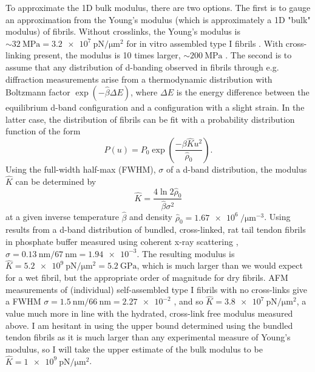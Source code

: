 \documentclass[12pt]{article}
\begin{document}
To approximate the 1D bulk modulus, there are two options. The first is to gauge an approximation from the Young's modulus (which is approximately a 1D "bulk" modulus) of fibrils. Without crosslinks, the Young's modulus is $\sim\SI{32}{\mega\pascal}=\SI{3.2e7}{\pico\newton\per\micro\meter^2}$ for in vitro assembled type I fibrils \cite{Graham:2004bl}. With cross-linking present, the modulus is 10 times larger, $\sim\SI{200}{\mega\pascal}$ \cite{vanderRijt:2006bt}. The second is to assume that any distribution of d-banding observed in fibrils through e.g. diffraction measurements arise from a thermodynamic distribution with Boltzmann factor $\exp(-\hat{\beta}\Delta E)$, where $\Delta E$ is the energy difference between the equilibrium d-band configuration and a configuration with a slight strain. In the latter case, the distribution of fibrils can be fit with a probability distribution function of the form
\begin{equation}\label{eq:dbandpdf}
P(u)=P_0\exp\left(\frac{-\beta\hat{K}u^2}{\hat{\rho}_0}\right).
\end{equation}
Using the full-width half-max (FWHM), $\sigma$ of a d-band distribution, the modulus $\hat{K}$ can be determined by
\begin{equation}\label{eq:FWHM}
\hat{K}=\frac{4\ln2\hat{\rho}_0}{\hat{\beta}\sigma^2}
\end{equation}
at a given inverse temperature $\hat{\beta}$ and density $\hat{\rho}_0=\SI{1.67e6}{\per\micro\meter^{-3}}$. Using results from a d-band distribution of bundled, cross-linked, rat tail tendon fibrils in phosphate buffer measured using coherent x-ray scattering \cite{Berenguer:2014fe}, $\sigma=\SI{0.13}{\nano\meter}/\SI{67}{\nano\meter}=\num{1.94e-3}$. The resulting modulus is $\hat{K}=\SI{5.2e9}{\pico\newton\per\micro\meter\squared}=\SI{5.2}{\giga\pascal}$, which is much larger than we would expect for a wet fibril, but the appropriate order of magnitude for dry fibrils. AFM measurements of (individual) self-assembled type I fibrils with no cross-links give a FWHM $\sigma=\SI{1.5}{\nano\meter}/\SI{66}{\nano\meter}=\num{2.27e-2}$ \cite{Fang:2013ba}, and so $\hat{K}=\SI{3.8e7}{\pico\newton\per\micro\meter^2}$, a value much more in line with the hydrated, cross-link free modulus measured above. I am hesitant in using the upper bound determined using the bundled tendon fibrils as it is much larger than any experimental measure of Young's modulus, so I will take the upper estimate of the bulk modulus to be $\hat{K}=\SI{1e9}{\pico\newton\per\micro\meter\squared}$.
\end{document}
